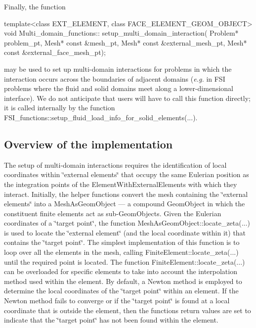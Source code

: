 Finally, the function 
\begin{DoxyCode}
\textcolor{keyword}{template}<\textcolor{keyword}{class} EXT\_ELEMENT, \textcolor{keyword}{class} FACE\_ELEMENT\_GEOM\_OBJECT>
\textcolor{keywordtype}{void} Multi\_domain\_functions:: setup\_multi\_domain\_interaction(
                                       Problem* problem\_pt,
                                       Mesh* \textcolor{keyword}{const} &mesh\_pt,
                                       Mesh* \textcolor{keyword}{const} &external\_mesh\_pt,
                                       Mesh* \textcolor{keyword}{const} &external\_face\_mesh\_pt);
\end{DoxyCode}


may be used to set up multi-\/domain interactions for problems in which the interaction occurs across the boundaries of adjacent domains ({\itshape  e.\+g. } in F\+SI problems where the fluid and solid domains meet along a lower-\/dimensional interface). We do not anticipate that users will have to call this function directly; it is called internally by the function {\ttfamily F\+S\+I\+\_\+functions\+::setup\+\_\+fluid\+\_\+load\+\_\+info\+\_\+for\+\_\+solid\+\_\+elements}(...).



\hypertarget{index_overview}{}\subsection{Overview of the implementation}\label{index_overview}
The setup of multi-\/domain interactions requires the identification of local coordinates within \char`\"{}external elements\char`\"{} that occupy the same Eulerian position as the integration points of the {\ttfamily Element\+With\+External\+Elements} with which they interact. Initially, the helper functions convert the mesh containing the \char`\"{}external elements\char`\"{} into a {\ttfamily Mesh\+As\+Geom\+Object} --- a compound {\ttfamily Geom\+Object} in which the constituent finite elements act as sub-\/{\ttfamily Geom\+Objects}. Given the Eulerian coordinates of a \char`\"{}target point\char`\"{}, the function {\ttfamily Mesh\+As\+Geom\+Object\+::locate\+\_\+zeta}(...) is used to locate the \char`\"{}external element\char`\"{} (and the local coordinate within it) that contains the \char`\"{}target point\char`\"{}. The simplest implementation of this function is to loop over all the elements in the mesh, calling {\ttfamily Finite\+Element\+::locate\+\_\+zeta}(...) until the required point is located. The function {\ttfamily Finite\+Element\+::locate\+\_\+zeta}(...) can be overloaded for specific elements to take into account the interpolation method used within the element. By default, a Newton method is employed to determine the local coordinates of the \char`\"{}target point\char`\"{} within an element. If the Newton method fails to converge or if the \char`\"{}target point\char`\"{} is found at a local coordinate that is outside the element, then the functions return values are set to indicate that the \char`\"{}target point\char`\"{} has not been found within the element.

